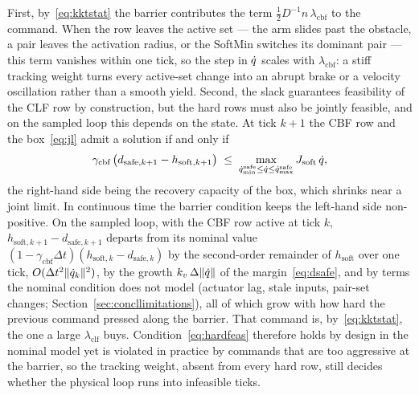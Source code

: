 First, by~\eqref{eq:kktstat} the barrier contributes the term $\tfrac{1}{2}D^{-1}n\,\lambda_{\text{cbf}}$ to the command. When the row leaves the active set --- the arm slides past the obstacle, a pair leaves the activation radius, or the SoftMin switches its dominant pair --- this term vanishes within one tick, so the step in $\dot{q}$ scales with $\lambda_{\text{cbf}}$: a stiff tracking weight turns every active-set change into an abrupt brake or a velocity oscillation rather than a smooth yield. Second, the slack guarantees feasibility of the CLF row by construction, but the hard rows must also be jointly feasible, and on the sampled loop this depends on the state. At tick $k+1$ the CBF row and the box~\eqref{eq:jl} admit a solution if and only if
\begin{equation}
\gamma_{\text{cbf}}\,\bigl(d_{\text{safe},k+1} - h_{\text{soft},k+1}\bigr) \;\le\; \max_{\dot{q}^{\text{safe}}_{\min} \le \dot{q} \le \dot{q}^{\text{safe}}_{\max}} J_{\text{soft}}\,\dot{q},
\label{eq:hardfeas}
\end{equation}
the right-hand side being the recovery capacity of the box, which shrinks near a joint limit. In continuous time the barrier condition keeps the left-hand side non-positive. On the sampled loop, with the CBF row active at tick $k$, $h_{\text{soft},k+1} - d_{\text{safe},k+1}$ departs from its nominal value $(1 - \gamma_{\text{cbf}}\Delta t)(h_{\text{soft},k} - d_{\text{safe},k})$ by the second-order remainder of $h_{\text{soft}}$ over one tick, $O(\Delta t^2\|\dot{q}_k\|^2)$, by the growth $k_v\,\Delta\|\dot{q}\|$ of the margin~\eqref{eq:dsafe}, and by terms the nominal condition does not model (actuator lag, stale inputs, pair-set changes; Section~\ref{sec:concllimitations}), all of which grow with how hard the previous command pressed along the barrier. That command is, by~\eqref{eq:kktstat}, the one a large $\lambda_{\text{clf}}$ buys. Condition~\eqref{eq:hardfeas} therefore holds by design in the nominal model yet is violated in practice by commands that are too aggressive at the barrier, so the tracking weight, absent from every hard row, still decides whether the physical loop runs into infeasible ticks.

